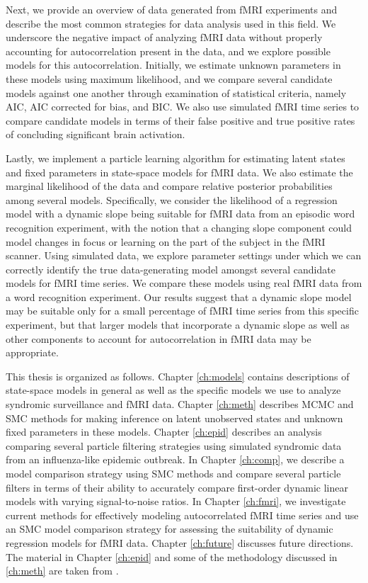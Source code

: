 Next, we provide an overview of data generated from fMRI experiments and describe the most common strategies for data analysis used in this field. We underscore the negative impact of analyzing fMRI data without properly accounting for autocorrelation present in the data, and we explore possible models for this autocorrelation. Initially, we estimate unknown parameters in these models using maximum likelihood, and we compare several candidate models against one another through examination of statistical criteria, namely AIC, AIC corrected for bias, and BIC. We also use simulated fMRI time series to compare candidate models in terms of their false positive and true positive rates of concluding significant brain activation.

Lastly, we implement a particle learning algorithm for estimating latent states and fixed parameters in state-space models for fMRI data. We also estimate the marginal likelihood of the data and compare relative posterior probabilities among several models. Specifically, we consider the likelihood of a regression model with a dynamic slope being suitable for fMRI data from an episodic word recognition experiment, with the notion that a changing slope component could model changes in focus or learning on the part of the subject in the fMRI scanner. Using simulated data, we explore parameter settings under which we can correctly identify the true data-generating model amongst several candidate models for fMRI time series. We compare these models using real fMRI data from a word recognition experiment. Our results suggest that a dynamic slope model may be suitable only for a small percentage of fMRI time series from this specific experiment, but that larger models that incorporate a dynamic slope as well as other components to account for autocorrelation in fMRI data may be appropriate.

This thesis is organized as follows. Chapter \ref{ch:models} contains descriptions of state-space models in general as well as the specific models we use to analyze syndromic surveillance and fMRI data. Chapter \ref{ch:meth} describes MCMC and SMC methods for making inference on latent unobserved states and unknown fixed parameters in these models. Chapter \ref{ch:epid} describes an analysis comparing several particle filtering strategies using simulated syndromic data from an influenza-like epidemic outbreak. In Chapter \ref{ch:comp}, we describe a model comparison strategy using SMC methods and compare several particle filters in terms of their ability to accurately compare first-order dynamic linear models with varying signal-to-noise ratios. In Chapter \ref{ch:fmri}, we investigate current methods for effectively modeling autocorrelated fMRI time series and use an SMC model comparison strategy for assessing the suitability of dynamic regression models for fMRI data. Chapter \ref{ch:future} discusses future directions. The material in Chapter \ref{ch:epid} and some of the methodology discussed in \ref{ch:meth} are taken from \citet{sheinson:niemi:meiring:epidtrack:2014}. 